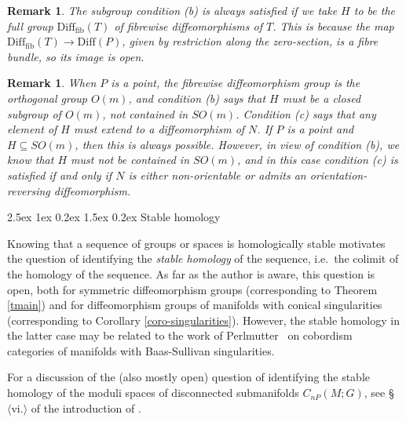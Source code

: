 \documentclass[reqno,a4paper]{article}
\makeatletter
\numberwithin{equation}{section}
\theoremstyle{italicised}
\theoremstyle{upright}
\newtheorem{rmk}[thm]{Remark}
\theoremstyle{italicised-restate}
\renewcommand*{\subsection}{\@startsection{subsection}{2}{\z@}%
	{2.5ex \@plus 1ex \@minus 0.2ex}%
	{1.5ex \@plus 0.2ex}%
	{\normalfont\normalsize\bfseries}}
\makeatother
\begin{document}
\begin{rmk}
The subgroup condition (b) is always satisfied if we take $H$ to be the full group $\mathrm{Diff}_{\mathrm{fib}}(T)$ of fibrewise diffeomorphisms of $T$. This is because the map $\mathrm{Diff}_{\mathrm{fib}}(T) \to \mathrm{Diff}(P)$, given by restriction along the zero-section, is a fibre bundle, so its image is open.
\end{rmk}

\begin{rmk}
When $P$ is a point, the fibrewise diffeomorphism group is the orthogonal group $O(m)$, and condition (b) says that $H$ must be a closed subgroup of $O(m)$, not contained in $SO(m)$. Condition (c) says that any element of $H$ must extend to a diffeomorphism of $N$. If $P$ is a point and $H \subseteq SO(m)$, then this is always possible. However, in view of condition (b), we know that $H$ must not be contained in $SO(m)$, and in this case condition (c) is satisfied if and only if $N$ is either non-orientable or admits an orientation-reversing diffeomorphism.
\end{rmk}


\subsection{Stable homology}
\label{ss:stable-homology}


Knowing that a sequence of groups or spaces is homologically stable motivates the question of identifying the \emph{stable homology} of the sequence, i.e.\ the colimit of the homology of the sequence. As far as the author is aware, this question is open, both for symmetric diffeomorphism groups (corresponding to Theorem \ref{tmain}) and for diffeomorphism groups of manifolds with conical singularities (corresponding to Corollary \ref{coro-singularities}). However, the stable homology in the latter case may be related to the work of Perlmutter~\cite{Perlmutter2015Cobordismcategorymanifolds,Perlmutter2013CobordismCategoryof} on cobordism categories of manifolds with Baas-Sullivan singularities.

For a discussion of the (also mostly open) question of identifying the stable homology of the moduli spaces of disconnected submanifolds $C_{nP}(M;G)$, see \S$\langle\text{vi.}\rangle$ of the introduction of \cite{Palmer2018HomologicalstabilitymoduliI}.
\end{document}
